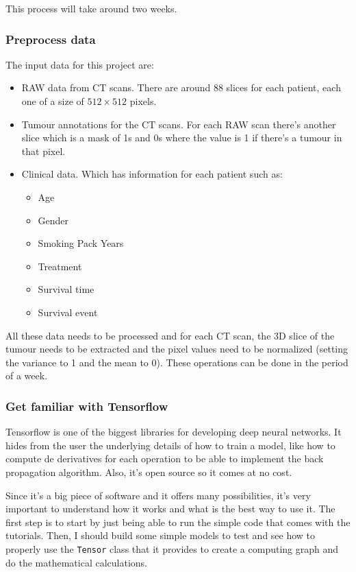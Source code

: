 This process will take around two weeks.

\subsubsection{Preprocess data}

The input data for this project are:
\begin{itemize}
  \item RAW data from CT scans. There are around 88 slices for each patient, each one of 
  a size of \( 512 \times 512 \) pixels.
  \item Tumour annotations for the CT scans. For each RAW scan there's another slice which
  is a mask of 1s and 0s where the value is 1 if there's a tumour in that pixel.
  \item Clinical data. Which has information for each patient such as:
  \begin{itemize}
    \item Age
    \item Gender
    \item Smoking Pack Years
    \item Treatment
    \item Survival time
    \item Survival event
  \end{itemize}
\end{itemize}

All these data needs to be processed and for each CT scan, the 3D slice of the tumour needs to
be extracted and the pixel values need to be normalized (setting the variance to 1 and the 
mean to 0). These operations can be done in the period of a week.

\subsubsection{Get familiar with Tensorflow}

Tensorflow is one of the biggest libraries for developing deep neural networks. It hides from the 
user the underlying details of how to train a model, like how to compute de derivatives for 
each operation to be able to implement the back propagation algorithm. Also, it's open source
so it comes at no cost.

Since it's a big piece of software and it offers many possibilities, it's very important to 
understand how it works and what is the best way to use it. The first step is to start by 
just being able to run the simple code that comes with the tutorials. Then, I should build
some simple models to test and see how to properly use the \texttt{Tensor} class that it
provides to create a computing graph and do the mathematical calculations.

